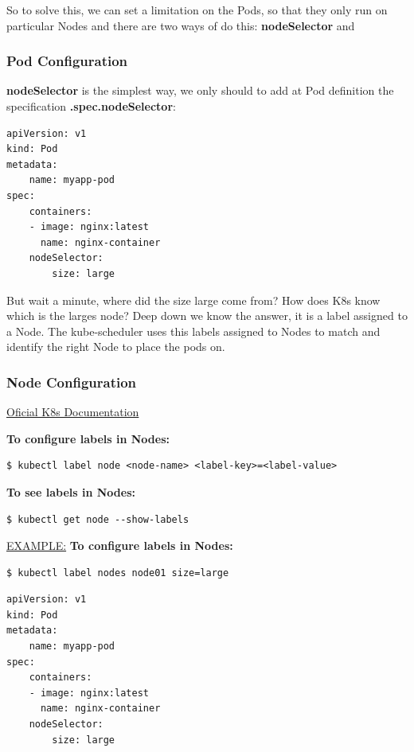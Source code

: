 \documentclass{article}
\newenvironment{codetemplate}[1][]{%
  \mybasecolorbox[#1]
  \itshape
}{%
  \endmybasecolorbox
}
\begin{document}
So to solve this, we can set a limitation on the Pods, so that they only run on particular Nodes and there are two ways of do this: \textbf{nodeSelector} and

\subsubsection{Pod Configuration}
\textbf{nodeSelector} is the simplest way, we only should to add at Pod definition the specification \textbf{.spec.nodeSelector}:

\begin{codetemplate}{}
\begin{verbatim}
apiVersion: v1
kind: Pod
metadata:
    name: myapp-pod
spec:
    containers:
    - image: nginx:latest
      name: nginx-container
    nodeSelector:
        size: large
\end{verbatim}
\end{codetemplate}

But wait a minute, where did the size large come from? How does K8s know which is the larges node? Deep down we know the answer, it is a label assigned to a Node. The kube-scheduler uses this labels assigned to Nodes to match and identify the right Node to place the pods on.

\subsubsection{Node Configuration}

\href{https://kubernetes.io/docs/tasks/configure-pod-container/assign-pods-nodes/}{Oficial K8s Documentation}


\textbf{To configure labels in Nodes:}
\begin{codetemplate}{}
\begin{verbatim}
$ kubectl label node <node-name> <label-key>=<label-value>
\end{verbatim}
\end{codetemplate}

\textbf{To see labels in Nodes:}
\begin{codetemplate}{}
\begin{verbatim}
$ kubectl get node --show-labels
\end{verbatim}
\end{codetemplate}

\underline{EXAMPLE:}
\textbf{To configure labels in Nodes:}
\begin{codetemplate}{}
\begin{verbatim}
$ kubectl label nodes node01 size=large
\end{verbatim}
\begin{codetemplate}{}
\begin{verbatim}
apiVersion: v1
kind: Pod
metadata:
    name: myapp-pod
spec:
    containers:
    - image: nginx:latest
      name: nginx-container
    nodeSelector:
        size: large
\end{verbatim}
\end{codetemplate}

\end{codetemplate}
\end{document}
